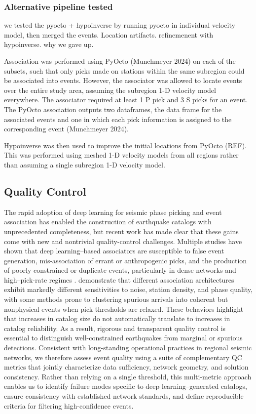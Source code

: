 \documentclass[review]{seismica}
\begin{document}
\subsubsection{Alternative pipeline
tested}\label{alternative-pipeline-tested}

we tested the pyocto + hypoinverse by running pyocto in individual
velocity model, then merged the events. Location artifacts. refinemenent
with hypoinverse. why we gave up.

Association was performed using PyOcto (Munchmeyer 2024) on each of the
subsets, such that only picks made on stations within the same subregion
could be associated into events. However, the associator was allowed to
locate events over the entire study area, assuming the subregion 1-D
velocity model everywhere. The associator required at least 1 P pick and
3 S picks for an event. The PyOcto association outputs two dataframes,
the data frame for the associated events and one in which each pick
information is assigned to the corresponding event (Munchmeyer 2024).

Hypoinverse was then used to improve the initial locations from PyOcto
(REF). This was performed using meshed 1-D velocity models from all
regions rather than assuming a single subregion 1-D velocity model.

\subsection{Quality Control}\label{quality-control}

The rapid adoption of deep learning for seismic phase picking and event
association has enabled the construction of earthquake catalogs with
unprecedented completeness, but recent work has made clear that these
gains come with new and nontrivial quality-control challenges. Multiple
studies have shown that deep learning--based associators are susceptible
to false event generation, mis-association of errant or anthropogenic
picks, and the production of poorly constrained or duplicate events,
particularly in dense networks and high--pick-rate regimes
\citep[e.g.,][]{Armstrong23, Yuan23, Pennington25}. \citet{Pennington25}
demonstrate that different association architectures exhibit markedly
different sensitivities to noise, station density, and phase quality,
with some methods prone to clustering spurious arrivals into coherent
but nonphysical events when pick thresholds are relaxed. These behaviors
highlight that increases in catalog size do not automatically translate
to increases in catalog reliability. As a result, rigorous and
transparent quality control is essential to distinguish well-constrained
earthquakes from marginal or spurious detections. Consistent with
long-standing operational practices in regional seismic networks, we
therefore assess event quality using a suite of complementary QC metrics
that jointly characterize data sufficiency, network geometry, and
solution consistency. Rather than relying on a single threshold, this
multi-metric approach enables us to identify failure modes specific to
deep learning--generated catalogs, ensure consistency with established
network standards, and define reproducible criteria for filtering
high-confidence events.
\end{document}
